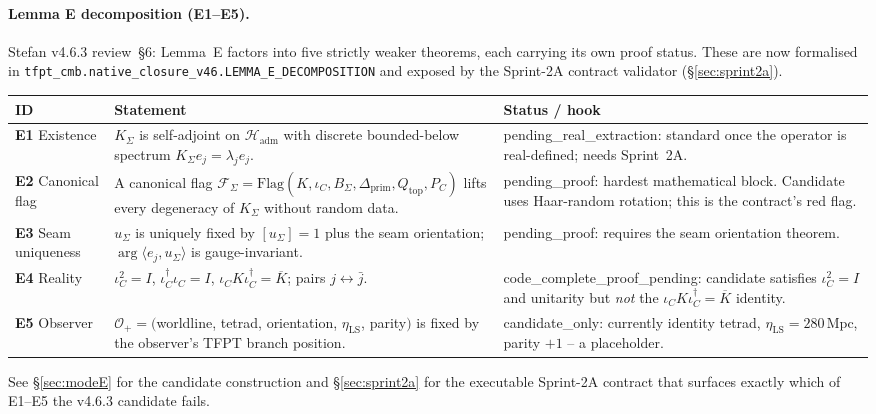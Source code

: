 \paragraph{Lemma E decomposition (E1--E5).}
Stefan v4.6.3 review~\S6: Lemma~E factors into five strictly weaker
theorems, each carrying its own proof status.  These are now
formalised in
\texttt{tfpt\_cmb.native\_closure\_v46.LEMMA\_E\_DECOMPOSITION}
and exposed by the Sprint-2A contract validator
(\S\ref{sec:sprint2a}).
\begin{center}
\renewcommand{\arraystretch}{1.13}
\begin{tabularx}{\textwidth}{@{}p{}p{}Y@{}}
\toprule
\textbf{ID} & \textbf{Statement} & \textbf{Status / hook} \\
\midrule
\textbf{E1} Existence
& \(K_\Sigma\) is self-adjoint on \(\mathcal H_{\mathrm{adm}}\) with
discrete bounded-below spectrum \(K_\Sigma e_j=\lambda_j e_j\).
& \textsf{pending\_real\_extraction}: standard once the operator is
real-defined; needs Sprint~2A.\\
\textbf{E2} Canonical flag
& A canonical flag
\(\mathcal F_\Sigma=\mathrm{Flag}(K,\iota_C,B_\Sigma,\Delta_{\mathrm{prim}},Q_{\mathrm{top}},P_C)\)
lifts every degeneracy of \(K_\Sigma\) without random data.
& \textsf{pending\_proof}: hardest mathematical block.  Candidate
uses Haar-random rotation; this is the contract's red flag.\\
\textbf{E3} Seam uniqueness
& \(u_\Sigma\) is uniquely fixed by \([u_\Sigma]=1\) plus the seam
orientation; \(\arg\langle e_j,u_\Sigma\rangle\) is gauge-invariant.
& \textsf{pending\_proof}: requires the seam orientation theorem.\\
\textbf{E4} Reality
& \(\iota_C^2=I\), \(\iota_C^\dagger\iota_C=I\),
\(\iota_C K \iota_C^\dagger=\overline{K}\); pairs \(j\leftrightarrow\bar j\).
& \textsf{code\_complete\_proof\_pending}: candidate satisfies
\(\iota_C^2=I\) and unitarity but \emph{not} the
\(\iota_C K \iota_C^\dagger=\overline{K}\) identity.\\
\textbf{E5} Observer
& \(\mathcal O_+=(\)worldline, tetrad, orientation, \(\eta_{\mathrm{LS}}\), parity\()\) is fixed by the observer's TFPT branch position.
& \textsf{candidate\_only}: currently identity tetrad,
\(\eta_{\mathrm{LS}}=280\,\mathrm{Mpc}\), parity \(+1\) -- a placeholder.\\
\bottomrule
\end{tabularx}
\end{center}
See \S\ref{sec:modeE} for the candidate construction and \S\ref{sec:sprint2a}
for the executable Sprint-2A contract that surfaces exactly which of
E1--E5 the v4.6.3 candidate fails.

